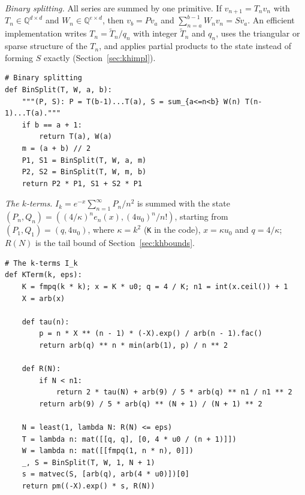 \documentclass[11pt,reqno]{amsart}
\theoremstyle{definition}
\theoremstyle{remark}
\newcommand{\QQ}{\mathbb{Q}}
\begin{document}
\emph{Binary splitting.} All series are summed by one primitive. If $v_{n+1} = T_nv_n$ with
$T_n \in \QQ^{d\times d}$ and $W_n \in \QQ^{e\times d}$, then $v_b = Pv_a$ and $\sum_{n=a}^{b-1}W_nv_n = Sv_a$. An
efficient implementation writes $T_n = \tilde T_n/q_n$ with integer $\tilde T_n$ and $q_n$, uses the triangular or
sparse structure of the $T_n$, and applies partial products to the state instead of forming $S$ exactly
(Section~\ref{sec:khimpl}).
\begin{lstlisting}[style=ref, firstnumber=39]
# Binary splitting
def BinSplit(T, W, a, b):
    """(P, S): P = T(b-1)...T(a), S = sum_{a<=n<b} W(n) T(n-1)...T(a)."""
    if b == a + 1:
        return T(a), W(a)
    m = (a + b) // 2
    P1, S1 = BinSplit(T, W, a, m)
    P2, S2 = BinSplit(T, W, m, b)
    return P2 * P1, S1 + S2 * P1
\end{lstlisting}

\emph{The $k$-terms.} $I_k = e^{-x}\sum_{n=1}^{\infty}P_n/n^2$ is summed with the state
$(P_n, Q_n) = ((4/\kappa)^ne_n(x), (4u_0)^n/n!)$, starting from $(P_1, Q_1) = (q, 4u_0)$, where $\kappa = k^2$ (\texttt{K} in the code), $x = \kappa u_0$ and
$q = 4/\kappa$; $R(N)$ is the tail bound of Section~\ref{sec:khbounds}.
\begin{lstlisting}[style=ref, firstnumber=49]
# The k-terms I_k
def KTerm(k, eps):
    K = fmpq(k * k); x = K * u0; q = 4 / K; n1 = int(x.ceil()) + 1
    X = arb(x)

    def tau(n):
        p = n * X ** (n - 1) * (-X).exp() / arb(n - 1).fac()
        return arb(q) ** n * min(arb(1), p) / n ** 2

    def R(N):
        if N < n1:
            return 2 * tau(N) + arb(9) / 5 * arb(q) ** n1 / n1 ** 2
        return arb(9) / 5 * arb(q) ** (N + 1) / (N + 1) ** 2

    N = least(1, lambda N: R(N) <= eps)
    T = lambda n: mat([[q, q], [0, 4 * u0 / (n + 1)]])
    W = lambda n: mat([[fmpq(1, n * n), 0]])
    _, S = BinSplit(T, W, 1, N + 1)
    s = matvec(S, [arb(q), arb(4 * u0)])[0]
    return pm((-X).exp() * s, R(N))
\end{lstlisting}
\end{document}
